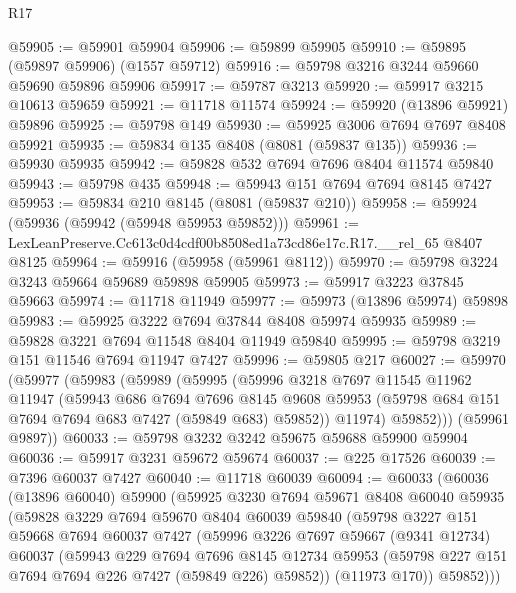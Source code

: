 \begin{lexlean}{R17}
\begin{coremodule}
@59905 := @59901 @59904
@59906 := @59899 @59905
@59910 := @59895 (@59897 @59906) (@1557 @59712)
@59916 := @59798 @3216 @3244 @59660 @59690 @59896 @59906
@59917 := @59787 @3213
@59920 := @59917 @3215 @10613 @59659
@59921 := @11718 @11574
@59924 := @59920 (@13896 @59921) @59896
@59925 := @59798 @149
@59930 := @59925 @3006 @7694 @7697 @8408 @59921
@59935 := @59834 @135 @8408 (@8081 (@59837 @135))
@59936 := @59930 @59935
@59942 := @59828 @532 @7694 @7696 @8404 @11574 @59840
@59943 := @59798 @435
@59948 := @59943 @151 @7694 @7694 @8145 @7427
@59953 := @59834 @210 @8145 (@8081 (@59837 @210))
@59958 := @59924 (@59936 (@59942 (@59948 @59953 @59852)))
@59961 := LexLeanPreserve.Cc613c0d4cdf00b8508ed1a73cd86e17c.R17.__rel_65 @8407 @8125
@59964 := @59916 (@59958 (@59961 @8112))
@59970 := @59798 @3224 @3243 @59664 @59689 @59898 @59905
@59973 := @59917 @3223 @37845 @59663
@59974 := @11718 @11949
@59977 := @59973 (@13896 @59974) @59898
@59983 := @59925 @3222 @7694 @37844 @8408 @59974 @59935
@59989 := @59828 @3221 @7694 @11548 @8404 @11949 @59840
@59995 := @59798 @3219 @151 @11546 @7694 @11947 @7427
@59996 := @59805 @217
@60027 := @59970
    (@59977
      (@59983
        (@59989
          (@59995
            (@59996
              @3218
              @7697
              @11545
              @11962
              @11947
              (@59943
                @686
                @7694
                @7696
                @8145
                @9608
                @59953
                (@59798 @684 @151 @7694 @7694 @683 @7427 (@59849 @683) @59852))
              @11974)
            @59852)))
      (@59961 @9897))
@60033 := @59798 @3232 @3242 @59675 @59688 @59900 @59904
@60036 := @59917 @3231 @59672 @59674
@60037 := @225 @17526
@60039 := @7396 @60037 @7427
@60040 := @11718 @60039
@60094 := @60033
    (@60036
      (@13896 @60040)
      @59900
      (@59925
        @3230
        @7694
        @59671
        @8408
        @60040
        @59935
        (@59828
          @3229
          @7694
          @59670
          @8404
          @60039
          @59840
          (@59798
            @3227
            @151
            @59668
            @7694
            @60037
            @7427
            (@59996
              @3226
              @7697
              @59667
              (@9341 @12734)
              @60037
              (@59943
                @229
                @7694
                @7696
                @8145
                @12734
                @59953
                (@59798 @227 @151 @7694 @7694 @226 @7427 (@59849 @226) @59852))
              (@11973 @170))
            @59852)))

\end{coremodule}
\end{lexlean}
